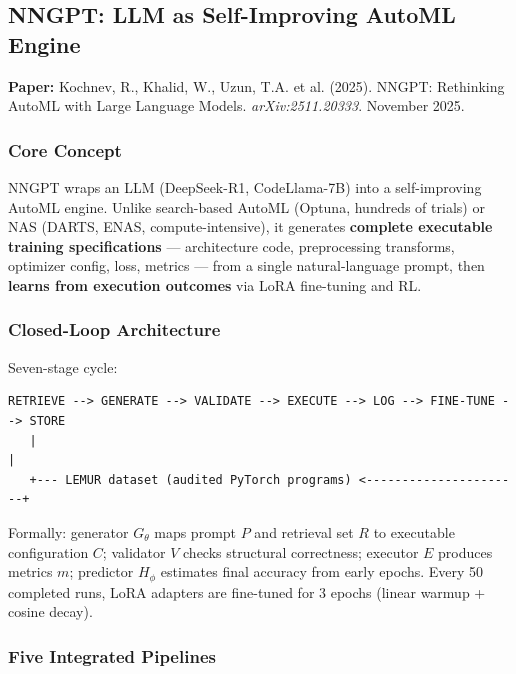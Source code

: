 \documentclass[11pt,a4paper]{article}
\begin{document}

\subsection{NNGPT: LLM as Self-Improving AutoML Engine}

\textbf{Paper:} Kochnev, R., Khalid, W., Uzun, T.A. et al. (2025). NNGPT: Rethinking AutoML with Large Language Models. \textit{arXiv:2511.20333}. November 2025.

\subsubsection{Core Concept}

NNGPT wraps an LLM (DeepSeek-R1, CodeLlama-7B) into a self-improving AutoML engine. Unlike search-based AutoML (Optuna, hundreds of trials) or NAS (DARTS, ENAS, compute-intensive), it generates \textbf{complete executable training specifications} --- architecture code, preprocessing transforms, optimizer config, loss, metrics --- from a single natural-language prompt, then \textbf{learns from execution outcomes} via LoRA fine-tuning and RL.

\subsubsection{Closed-Loop Architecture}

Seven-stage cycle:

\begin{verbatim}
RETRIEVE --> GENERATE --> VALIDATE --> EXECUTE --> LOG --> FINE-TUNE --> STORE
   |                                                                    |
   +--- LEMUR dataset (audited PyTorch programs) <----------------------+
\end{verbatim}

Formally: generator $G_\theta$ maps prompt $P$ and retrieval set $R$ to executable configuration $C$; validator $V$ checks structural correctness; executor $E$ produces metrics $m$; predictor $H_\phi$ estimates final accuracy from early epochs. Every 50 completed runs, LoRA adapters are fine-tuned for 3 epochs (linear warmup + cosine decay).

\subsubsection{Five Integrated Pipelines}
\end{document}
